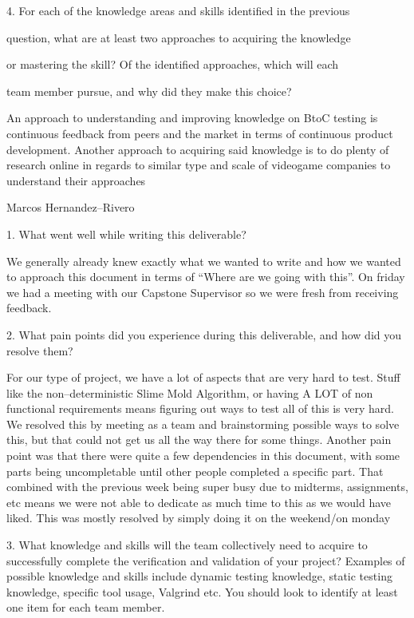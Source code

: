 \documentclass[12pt, titlepage]{article}
\begin{document}
4. For each of the knowledge areas and skills identified in the previous

question, what are at least two approaches to acquiring the knowledge

or mastering the skill? Of the identified approaches, which will each

team member pursue, and why did they make this choice?

An approach to understanding and improving knowledge on BtoC testing is continuous feedback from peers and the market in terms of continuous product development. Another approach to acquiring said knowledge is to do plenty of research online in regards to similar type and scale of videogame companies to understand their approaches

Marcos Hernandez--Rivero

1. What went well while writing this deliverable?

We generally already knew exactly what we wanted to write and how we wanted to approach this document in terms of “Where are we going with this”. On friday we had a meeting with our Capstone Supervisor so we were fresh from receiving feedback.

2. What pain points did you experience during this deliverable, and how did you resolve them?

For our type of project, we have a lot of aspects that are very hard to test. Stuff like the non--deterministic Slime Mold Algorithm, or having A LOT of non functional requirements means figuring out ways to test all of this is very hard. We resolved this by meeting as a team and brainstorming possible ways to solve this, but that could not get us all the way there for some things. Another pain point was that there were quite a few dependencies in this document, with some parts being uncompletable until other people completed a specific part. That combined with the previous week being super busy due to midterms, assignments, etc means we were not able to dedicate as much time to this as we would have liked. This was mostly resolved by simply doing it on the weekend/on monday

3. What knowledge and skills will the team collectively need to acquire to successfully complete the verification and validation of your project? Examples of possible knowledge and skills include dynamic testing knowledge, static testing knowledge, specific tool usage, Valgrind etc. You should look to identify at least one item for each team member.
\end{document}
